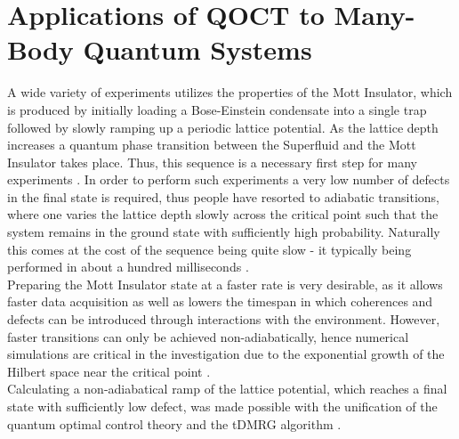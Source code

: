 \chapter{Applications of QOCT to Many-Body Quantum Systems}

A wide variety of experiments utilizes the properties of the Mott Insulator, which is produced by initially loading a Bose-Einstein condensate into a single trap followed by slowly ramping up a periodic lattice potential. As the lattice depth increases a quantum phase transition between the Superfluid and the Mott Insulator takes place. Thus, this sequence is a necessary first step for many experiments \cite{manybodyBloch}. In order to perform such experiments a very low number of defects in the final state is required, thus people have resorted to adiabatic transitions, where one varies the lattice depth slowly across the critical point such that the system remains in the ground state with sufficiently high probability. Naturally this comes at the cost of the sequence being quite slow - it typically being performed in about a hundred milliseconds \cite{JakschZoller}.\\
Preparing the Mott Insulator state at a faster rate is very desirable, as it allows faster data acquisition as well as lowers the timespan in which coherences and defects can be introduced through interactions with the environment. However, faster transitions can only be achieved non-adiabatically, hence numerical simulations are critical in the investigation due to the exponential growth of the Hilbert space near the critical point \cite{Vidal2003}.\\

Calculating a non-adiabatical ramp of the lattice potential, which reaches a final state with sufficiently low defect, was made possible with the unification of the quantum optimal control theory and the tDMRG algorithm \cite{Doria2011,FrankBloch}. 

